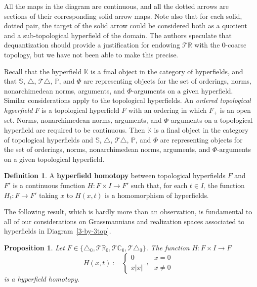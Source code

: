 \documentclass[10pt, preprint]{article}
\newtheorem{prop}[theorem]{Proposition}
\theoremstyle{definition}
\newtheorem{definition}[theorem]{Definition}
\begin{document}
All the maps in the diagram are continuous, and all the dotted arrows
are sections of their corresponding solid arrow maps. Note also that for
each solid, dotted pair, the target of the solid arrow could be
considered both as a quotient and a sub-topological hyperfield of the
domain. The authors speculate that dequantization should provide a
justification for endowing $\mathcal{T }\mathbb{R}$ with the 0-coarse
topology, but we have not been able to make this precise.

Recall that the hyperfield $\mathbb{K}$ is a final object in the
category of hyperfields, and that $\mathbb{S}$, $\triangle $,
$\mathcal{T }\triangle $, $\mathbb{P}$, and $\Phi $ are representing
objects for the set of orderings, norms, nonarchimedean norms,
arguments, and $\Phi $-arguments on a given hyperfield. Similar
considerations apply to the topological hyperfields. An \emph{ordered
topological hyperfield} $F$ is a topological hyperfield $F$ with an
ordering in which $F_{+}$ is an open set. Norms, nonarchimedean norms,
arguments, and $\Phi $-arguments on a topological hyperfield are
required to be continuous. Then $\mathbb{K}$ is a final object in the
category of topological hyperfields and $\mathbb{S}$, $\triangle $,
$\mathcal{T }\triangle $, $\mathbb{P}$, and $\Phi $ are representing
objects for the set of orderings, norms, nonarchimedean norms,
arguments, and $\Phi $-arguments on a given topological hyperfield.

\begin{definition}
A \textbf{hyperfield homotopy} between topological hyperfields $F$ and
$F'$ is a continuous function $H: F\times I\to F'$ such that, for each
$t\in I$, the function $H_{t}:F\to F'$ taking $x$ to $H(x,t)$ is a
homomorphism of hyperfields.
\end{definition}

The following result, which is hardly more than an observation, is
fundamental to all of our considerations on Grassmannians and
realization spaces associated to hyperfields in
Diagram~\eqref{3-by-3top}.
%
\begin{prop}
\label{prop:homotopies}
Let $F\in \{\triangle _{0}, \mathcal{T }\mathbb{R}_{0},\mathcal{T }
\mathbb{C}_{0},\mathcal{T }\triangle _{0}\}$. The function $H : F
\times I \to F$
%
\begin{equation*}
H(x,t):=
%
\begin{cases}
0
& x = 0
\\
x|x|^{-t}
& x \neq 0
\end{cases}
%
\end{equation*}
%
is a hyperfield homotopy.
\end{prop}
\end{document}
